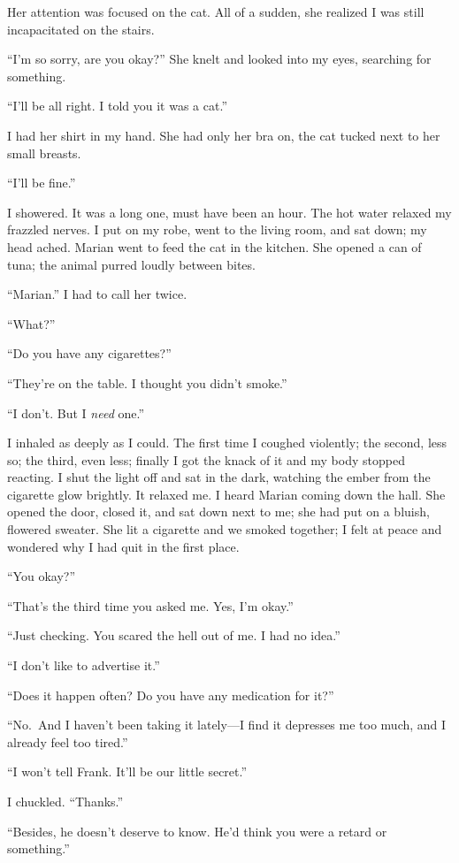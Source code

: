 \documentclass[
]{article}
\begin{document}
Her attention was focused on the cat. All of a sudden, she realized I
was still incapacitated on the stairs.

``I'm so sorry, are you okay?'' She knelt and looked into my eyes,
searching for something.

``I'll be all right. I told you it was a cat.''

I had her shirt in my hand. She had only her bra on, the cat tucked next
to her small breasts.

``I'll be fine.''

I showered. It was a long one, must have been an hour. The hot water
relaxed my frazzled nerves. I put on my robe, went to the living room,
and sat down; my head ached. Marian went to feed the cat in the kitchen.
She opened a can of tuna; the animal purred loudly between bites.

``Marian.'' I had to call her twice.

``What?''

``Do you have any cigarettes?''

``They're on the table. I thought you didn't smoke.''

``I don't. But I \emph{need} one.''

I inhaled as deeply as I could. The first time I coughed violently; the
second, less so; the third, even less; finally I got the knack of it and
my body stopped reacting. I shut the light off and sat in the dark,
watching the ember from the cigarette glow brightly. It relaxed me. I
heard Marian coming down the hall. She opened the door, closed it, and
sat down next to me; she had put on a bluish, flowered sweater. She lit
a cigarette and we smoked together; I felt at peace and wondered why I
had quit in the first place.

``You okay?''

``That's the third time you asked me. Yes, I'm okay.''

``Just checking. You scared the hell out of me. I had no idea.''

``I don't like to advertise it.''

``Does it happen often? Do you have any medication for it?''

``No.~And I haven't been taking it lately---I find it depresses me too
much, and I already feel too tired.''

``I won't tell Frank. It'll be our little secret.''

I chuckled. ``Thanks.''

``Besides, he doesn't deserve to know. He'd think you were a retard or
something.''
\end{document}
